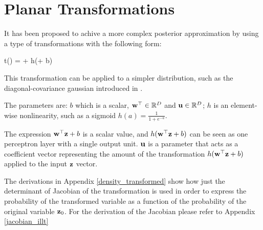 \section{Planar Transformations}\label{iltt}

It has been proposed\cite{1505.05770} to achive a more complex 
posterior approximation
by using a type of transformations with the following form:

\begin{nalign}
t(\boldz) = \boldz + \boldu h(\wt \boldz + b)
\end{nalign}

This transformation can be applied to a simpler distribution,
such as the diagonal-covariance gaussian
introduced in \cite{1312.6114}.

The parameters are: $b$ which is a scalar, 
${\mathbf{w}}^{\top} \in \mathbb{R}^D$ and $\mathbf{u} \in \mathbb{R}^D$;
$h$ is an element-wise nonlinearity,
such as a sigmoid $h(a) = \frac{1}{1+e^{-a}}$.


The expression ${\mathbf{w}}^{\top} \mathbf{z} + b$ is a scalar value,
and $h({\mathbf{w}}^{\top} \mathbf{z} + b)$ can be seen as one perceptron layer
with a single output unit. 
$\mathbf{u}$ is a parameter that acts as a coefficient vector
representing the amount of the transformation $h({\mathbf{w}}^{\top} \mathbf{z} + b)$
applied to the input $\mathbf{z}$ vector.

The derivations in Appendix \ref{density_transformed} show how just the 
determinant of Jacobian of the transformation
is used in order to express the probability of the transformed variable
as a function of the probability of the original variable $\mathbf{z}_0$.
For the derivation of the Jacobian please refer to Appendix \ref{jacobian_illt}

